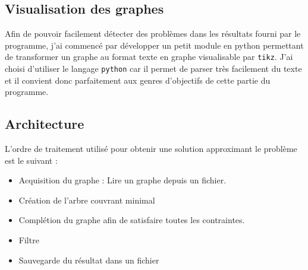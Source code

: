 \documentclass[a4paper,12pt]{article}
\begin{document}
\subsection{Visualisation des graphes}
Afin de pouvoir facilement détecter des problèmes dans les résultats fourni
par le programme, j'ai commencé par développer un petit module en python
permettant de transformer un graphe au format texte en graphe visualisable
par \verb!tikz!.
J'ai choisi d'utiliser le langage \verb!python! car il permet de parser très
facilement du texte et il convient donc parfaitement aux genres d'objectifs
de cette partie du programme.

\begin{figure}
  
\end{figure}

\subsection{Architecture}
L'ordre de traitement utilisé pour obtenir une solution approximant
le problème est le suivant :

\begin{itemize}
\item Acquisition du graphe : Lire un graphe depuis un fichier.
\item Création de l'arbre couvrant minimal
\item Complétion du graphe afin de satisfaire toutes les contraintes.
\item Filtre
\item Sauvegarde du résultat dans un fichier
\end{itemize}
\end{document}
